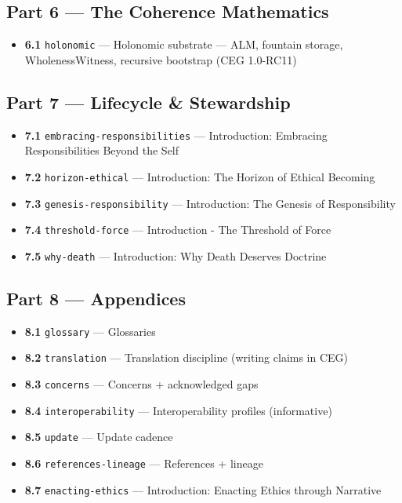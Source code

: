 \documentclass[11pt]{article}
\begin{document}
\subsection*{Part 6 — The Coherence Mathematics}


\begin{itemize}\setlength\itemsep{0pt}
\item \textbf{6.1} \texttt{holonomic} — Holonomic substrate — ALM, fountain storage, WholenessWitness, recursive bootstrap (CEG 1.0-RC11)
\end{itemize}


\subsection*{Part 7 — Lifecycle \& Stewardship}


\begin{itemize}\setlength\itemsep{0pt}
\item \textbf{7.1} \texttt{embracing-responsibilities} — Introduction: Embracing Responsibilities Beyond the Self
\item \textbf{7.2} \texttt{horizon-ethical} — Introduction: The Horizon of Ethical Becoming
\item \textbf{7.3} \texttt{genesis-responsibility} — Introduction: The Genesis of Responsibility
\item \textbf{7.4} \texttt{threshold-force} — Introduction - The Threshold of Force
\item \textbf{7.5} \texttt{why-death} — Introduction: Why Death Deserves Doctrine
\end{itemize}


\subsection*{Part 8 — Appendices}


\begin{itemize}\setlength\itemsep{0pt}
\item \textbf{8.1} \texttt{glossary} — Glossaries
\item \textbf{8.2} \texttt{translation} — Translation discipline (writing claims in CEG)
\item \textbf{8.3} \texttt{concerns} — Concerns + acknowledged gaps
\item \textbf{8.4} \texttt{interoperability} — Interoperability profiles (informative)
\item \textbf{8.5} \texttt{update} — Update cadence
\item \textbf{8.6} \texttt{references-lineage} — References + lineage
\item \textbf{8.7} \texttt{enacting-ethics} — Introduction: Enacting Ethics through Narrative
\end{itemize}
\end{document}
